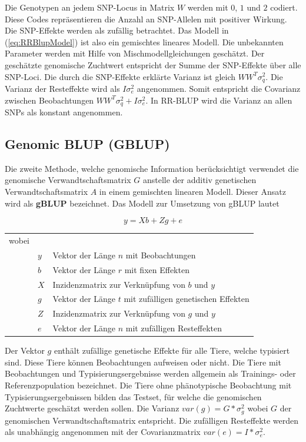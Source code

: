 \documentclass[]{book}
\begin{document}
Die Genotypen an jedem SNP-Locus in Matrix \(W\) werden mit \(0\), \(1\)
und \(2\) codiert. Diese Codes repräsentieren die Anzahl an SNP-Allelen
mit positiver Wirkung. Die SNP-Effekte werden als zufällig betrachtet.
Das Modell in (\ref{eq:RRBlupModel}) ist also ein gemischtes lineares
Modell. Die unbekannten Parameter werden mit Hilfe von
Mischmodellgleichungen geschätzt. Der geschätzte genomische Zuchtwert
entspricht der Summe der SNP-Effekte über alle SNP-Loci. Die durch die
SNP-Effekte erklärte Varianz ist gleich \(WW^T\sigma_q^2\). Die Varianz
der Resteffekte wird als \(I\sigma_e^2\) angenommen. Somit entspricht
die Covarianz zwischen Beobachtungen \(WW^T\sigma_q^2 + I\sigma_e^2\).
In RR-BLUP wird die Varianz an allen SNPs als konstant angenommen.

\subsection{Genomic BLUP (GBLUP)}\label{genomic-blup-gblup}

Die zweite Methode, welche genomische Information berücksichtigt
verwendet die genomische Verwandtschaftsmatrix \(G\) anstelle der
additiv genetischen Verwandtschaftsmatrix \(A\) in einem gemischten
linearen Modell. Dieser Ansatz wird als \textbf{gBLUP} bezeichnet. Das
Modell zur Umsetzung von gBLUP lautet

\begin{equation}
y = Xb + Zg + e
\label{eq:GblupModel}
\end{equation}

\begin{tabular}{lll}
wobei  &         & \\
       & $y$     & Vektor der Länge $n$ mit Beobachtungen \\
       & $b$     & Vektor der Länge $r$ mit fixen Effekten \\
       & $X$     & Inzidenzmatrix zur Verknüpfung von $b$ und $y$ \\
       & $g$     & Vektor der Länge $t$ mit zufälligen genetischen Effekten \\
       & $Z$     & Inzidenzmatrix zur Verknüpfung von $g$ und $y$ \\
       & $e$     & Vektor der Länge $n$ mit zufälligen Resteffekten
\end{tabular}

Der Vektor \(g\) enthält zufällige genetische Effekte für alle Tiere,
welche typisiert sind. Diese Tiere können Beobachtungen aufweisen oder
nicht. Die Tiere mit Beobachtungen und Typisierungsergebnisse werden
allgemein als Trainings- oder Referenzpopulation bezeichnet. Die Tiere
ohne phänotypische Beobachtung mit Typisierungsergebnissen bilden das
Testset, für welche die genomischen Zuchtwerte geschätzt werden sollen.
Die Varianz \(var(g) = G * \sigma_g^2\) wobei \(G\) der genomischen
Verwandtschaftsmatrix entspricht. Die zufälligen Resteffekte werden als
unabhängig angenommen mit der Covarianzmatrix \(var(e) = I*\sigma_e^2\).
\end{document}
